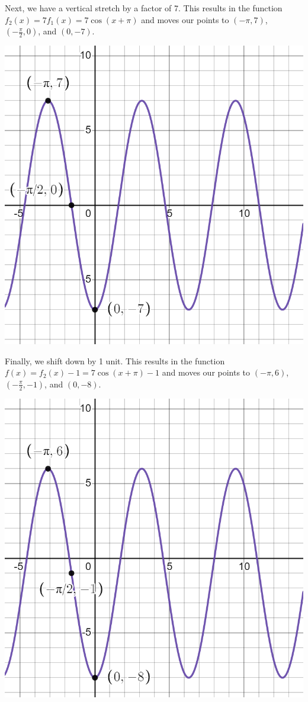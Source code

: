 \documentclass{ximera}
\begin{document}
\begin{example}
\begin{explanation}
Next, we have a vertical stretch by a factor of 7. This results in the function $f_2(x) = 7f_1(x) = 7\cos(x + \pi)$ and moves our points to $(-\pi, 7)$, $\left(-\frac{\pi}{2}, 0\right)$, and $(0, -7)$.
\begin{image}
\includegraphics[width=0.8\linewidth]{images/graph-ex3.png}
\end{image} 

Finally, we shift down by 1 unit. This results in the function $f(x) = f_2(x) - 1 = 7\cos(x + \pi) - 1$ and moves our points to $(-\pi, 6)$, $\left(-\frac{\pi}{2}, -1\right)$, and $(0, -8)$.
\begin{image}
\includegraphics[width=0.8\linewidth]{images/graph-ex4.png}
\end{image} 
\end{explanation}
\end{example}
%
%
%
\end{document}
